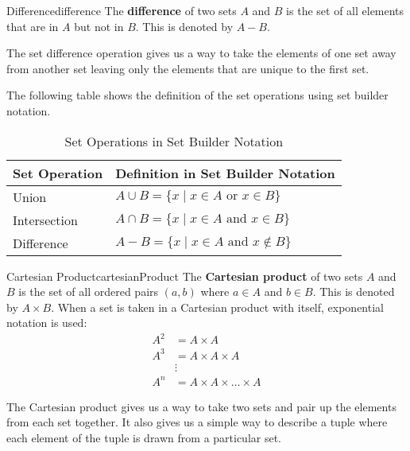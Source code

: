 \begin{definition}{Difference}{difference}
  The \textbf{difference} of two sets \( A \) and \( B \) is the set of all
  elements that are in \( A \) but not in \( B \). This is denoted by \( A - B \).
\end{definition}

The set difference operation gives us a way to take the elements of one set away from another set
leaving only the elements that are unique to the first set.

The following table shows the definition of the set operations using set builder notation.
\begin{table}[H]
  \centering
  \begin{tabular}{p{1in} p{3in}}
    \toprule
    \textbf{Set Operation} & \textbf{Definition in Set Builder Notation} \\
    \midrule
    Union & \( A \cup B = \{ x \mid x \in A \text{ or } x \in B \} \) \\
    Intersection & \( A \cap B = \{ x \mid x \in A \text{ and } x \in B \} \) \\
    Difference & \( A - B = \{ x \mid x \in A \text{ and } x \notin B \} \) \\
    \bottomrule
  \end{tabular}
  \caption{Set Operations in Set Builder Notation}
\end{table}

\begin{definition}{Cartesian Product}{cartesianProduct}
  The \textbf{Cartesian product} of two sets \( A \) and \( B \) is the set of all
  ordered pairs \( (a, b) \) where \( a \in A \) and \( b \in B \). This is denoted by
  \( A \times B \).
  \medskip
  When a set is taken in a Cartesian product with itself, exponential notation is used:
  \begin{align*}
    A^2 &= A \times A \\
    A^3 &= A \times A \times A \\
    &\vdots \\
    A^n &= A \times A \times \ldots \times A
  \end{align*}
\end{definition}

The Cartesian product gives us a way to take two sets and pair up the elements from each set together.
It also gives us a simple way to describe a tuple where each element of the tuple is drawn from a
particular set.

